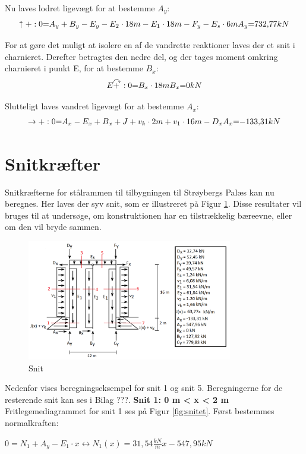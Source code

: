 Nu laves lodret ligevægt for at bestemme $A_y$:
\begin{equation}
	\uparrow+: 0 $=$ A_y + B_y - E_y - E_2 \cdot 18m - E_1 \cdot 18m - F_y - E_s \cdot 6 m
	\\
	A_y $=$ 732,\!77 kN
\end{equation}

For at gøre det muligt at isolere en af de vandrette reaktioner laves der et snit i charnieret. Derefter betragtes den nedre del, og der tages moment omkring charnieret i punkt E, for at bestemme $B_x$:
\begin{equation}
	E\AR+: 0 $=$ B_x \cdot 18m
	\\
	B_x $=$ 0 kN
\end{equation}

Slutteligt laves vandret ligevægt for at bestemme $A_x$:
\begin{equation}
	\rightarrow+: 0 $=$ A_x - E_x + B_x + J + v_k \cdot 2m + v_1 \cdot 16 m - D_x
	\\
	A_x $=$ -133,\!31 kN
\end{equation} 

\section{Snitkræfter}
Snitkræfterne for stålrammen til tilbygningen til Strøybergs Palæs kan nu beregnes. Her laves der syv snit, som er illustreret på Figur \ref{fig:snitbrud}. Disse resultater vil bruges til at undersøge, om konstruktionen har en tilstrækkelig bæreevne, eller om den vil bryde sammen. 

\begin{figure}[H]
	\centering
	\includegraphics[width=0.8\textwidth]{billeder/snitbrud.png}
	\caption{Snit}
	\label{fig:snitbrud}
\end{figure}

Nedenfor vises beregningseksempel for snit 1 og snit 5. Beregningerne for de resterende snit kan ses i Bilag ???. 
\newline
\newline
\textbf{Snit 1: 0 m < x < 2 m}
\newline
Fritlegemediagrammet for snit 1 ses på Figur \ref{fig:snitet}.
\newline
\newline
Først bestemmes normalkraften:
\begin{center}
	$0 = N_1 + A_y - E_1 \cdot x \leftrightarrow N_1(x) = 31,\!54 \frac{kN}{m} x - 547,\!95 kN $
\end{center}

